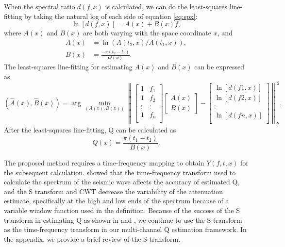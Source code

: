 When the spectral ratio $d(f,x)$ is calculated, we can do the least-squares line-fitting by taking the natural log of each side of equation \ref{eq:spx}:
\begin{equation}
\label{eq:logx}
\ln[d(f,x)] = A(x)+B(x)f,
\end{equation} 
where $A(x)$ and $B(x)$ are both varying with the space coordinate $x$, and 
\begin{align}
\label{eq:Ax}
A(x)&=\ln(A(t_2,x)/A(t_1,x)),\\
\label{eq:Bx}
B(x)&=\frac{-\pi(t_2-t_1)}{Q(x)}.
\end{align}
The least-squares line-fitting for estimating $A(x)$ and $B(x)$ can be expressed as 
\begin{equation}
\left(\hat{A}(x),\hat{B}(x) \right) = \displaystyle \arg \min_{\left(A(x),B(x)\right)}\left\|
\left[\begin{array}{cc}
1 & f_1\\
1 & f_2\\
\vdots & \vdots\\
1 & f_n\\
\end{array}\right]\left[\begin{array}{c}
A(x)\\
B(x)
\end{array}\right]-\left[\begin{array}{cc}
\ln[d(f1,x)]\\
\ln[d(f2,x)]\\
\vdots \\
\ln[d(fn,x)]\\
\end{array}\right] \right\|_2^2.
\end{equation}
After the least-squares line-fitting, Q can be calculated as
\begin{equation}
\label{eq:qx}
Q(x)=\frac{\pi(t_1-t_2)}{B(x)}.
\end{equation}

The proposed method requires a time-frequency mapping to obtain $Y(f,t,x)$ for the subsequent calculation. \cite{reine2009} showed that the time-frequency transform used to calculate the spectrum of the seismic wave affects the accuracy of estimated Q, and the S transform and CWT decrease the variability of the attenuation estimate, specifically at the high and low ends of the spectrum because of a variable window function used in the definition. Because of the success of the S transform in estimating Q as shown in \cite{reine2009} and \cite{guochang2010}, we continue to use the S transform as the time-frequency transform in our multi-channel Q estimation framework. In the appendix, we provide a brief review of the S transform.

